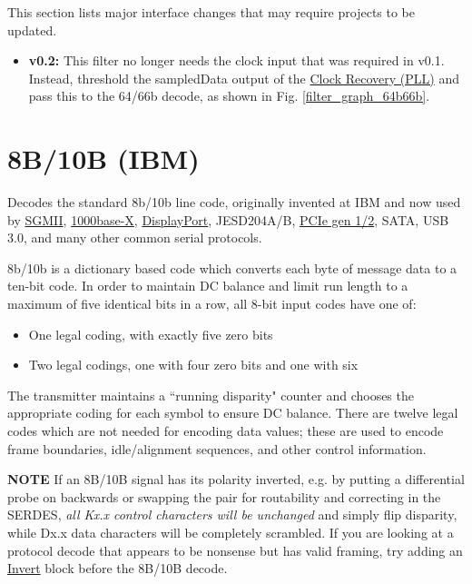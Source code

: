 This section lists major interface changes that may require projects to be updated.

\begin{itemize}
\item \textbf{v0.2:} This filter no longer needs the clock input that was required in v0.1.
Instead, threshold the sampledData output of the \hyperref[filter:cdrpll]{Clock Recovery (PLL)} and pass this to the
64/66b decode, as shown in Fig. \ref{filter_graph_64b66b}.
\end{itemize}

\pagebreak
\section{8B/10B (IBM)}
\label{filter:8b10b}

Decodes the standard 8b/10b line code, originally invented at IBM and now used by \hyperref[filter:sgmii]{SGMII},
\hyperref[filter:1000basex]{1000base-X}, \hyperref[filter:dpmain]{DisplayPort}, JESD204A/B,
\hyperref[filter:pcie2_logical]{PCIe gen 1/2}, SATA, USB 3.0, and many other common serial protocols.

8b/10b is a dictionary based code which converts each byte of message data to a ten-bit code. In order to maintain DC
balance and limit run length to a maximum of five identical bits in a row, all 8-bit input codes have one of:
\begin{itemize}
\item One legal coding, with exactly five zero bits
\item Two legal codings, one with four zero bits and one with six
\end{itemize}

The transmitter maintains a ``running disparity" counter and chooses the appropriate coding for each symbol to ensure
DC balance. There are twelve legal codes which are not needed for encoding data values; these are used to encode
frame boundaries, idle/alignment sequences, and other control information.

\textbf{NOTE} If an 8B/10B signal has its polarity inverted, e.g. by putting a differential probe on backwards or
swapping the pair for routability and correcting in the SERDES, \emph{all Kx.x control characters will be unchanged}
and simply flip disparity, while Dx.x data characters will be completely scrambled. If you are looking at a protocol
decode that appears to be nonsense but has valid framing, try adding an \hyperref[filter:invert]{Invert} block before
the 8B/10B decode.

